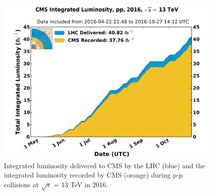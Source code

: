\begin{figure}[h!]
	\centering
	\includegraphics[width=\linewidth]{Figures/Detector/int_lumi_per_day_cumulative_pp_2016.pdf}
       \caption{Integrated luminosity delivered to CMS by the LHC (blue) and the integrated luminosity recorded by CMS (orange) during p-p collisions at $\sqrt{s}$ = 13 TeV in 2016.}
         \label{fig:lumi}
\end{figure}






